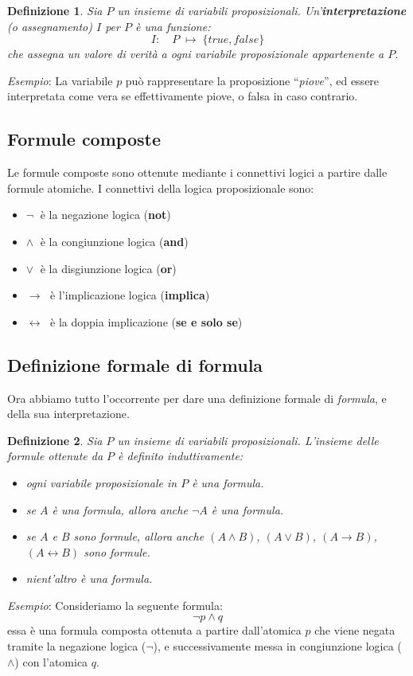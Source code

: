 \documentclass[a4paper,12pt]{report}
\newcommand{\tto} {\leftrightarrow}
\newtheorem{definition}{Definizione}[section]
\begin{document}
\begin{definition}
    Sia $P$ un insieme di variabili proposizionali. Un'\textbf{interpretazione} (o assegnamento) $I$ per $P$ è una funzione:
    \[
        I: \quad P \; \mapsto \; \{true, false\}
    \]
    che assegna un valore di verità a ogni variabile proposizionale appartenente a $P$.
\end{definition}

\noindent \emph{Esempio}: La variabile $p$ può rappresentare la proposizione ``\emph{piove}'', ed essere interpretata come vera se effettivamente piove, o falsa in caso contrario.

\subsection*{Formule composte}
Le formule composte sono ottenute mediante i connettivi logici a partire dalle formule atomiche. I connettivi della logica proposizionale sono:
\begin{itemize}
    \item $\lnot\;$ è la negazione logica (\textbf{not})
    \item $\land\;$ è la congiunzione logica (\textbf{and})
    \item $\lor\;$ è la disgiunzione logica (\textbf{or})
    \item $\to\;$ è l'implicazione logica (\textbf{implica})
    \item $\tto\;$ è la doppia implicazione (\textbf{se e solo se})
\end{itemize}

\subsection{Definizione formale di formula}
\label{def_formula}
Ora abbiamo tutto l'occorrente per dare una definizione formale di \emph{formula}, e della sua interpretazione.
\begin{definition}
    Sia $P$ un insieme di variabili proposizionali. L'insieme delle formule ottenute da $P$ è definito induttivamente:
    \begin{itemize}
        \item ogni variabile proposizionale in $P$ è una formula.
        \item se $A$ è una formula, allora anche $\lnot A$ è una formula.
        \item se $A$ e $B$ sono formule, allora anche $(A \land B)$, $(A \lor B)$, $(A \to B)$, $(A \tto B)$ sono formule.
        \item nient'altro è una formula.
    \end{itemize}
\end{definition}
\noindent \emph{Esempio}: Consideriamo la seguente formula: 
\[ \lnot p \land q \] 
essa è una formula composta ottenuta a partire dall'atomica $p$ che viene negata tramite la negazione logica ($\lnot$), e successivamente messa in congiunzione logica ($\land$) con l'atomica $q$.
\end{document}
